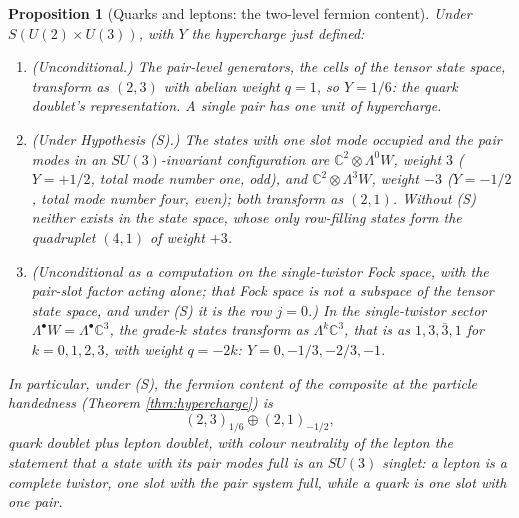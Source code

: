 \documentclass[11pt]{article}
\newtheorem{proposition}[theorem]{Proposition}
\theoremstyle{definition}
\newcommand{\C}{\mathbb{C}}
\begin{document}
\begin{proposition}[Quarks and leptons: the two-level fermion content]\label{prop:content}
Under $S(U(2) \times U(3))$, with $Y$ the hypercharge just defined:
\begin{enumerate}
\item (Unconditional.) The pair-level generators, the cells of the tensor state space, transform as $(2, 3)$ with abelian weight $q = 1$, so $Y = 1/6$: the quark doublet's representation. A single pair has one unit of hypercharge.
\item (Under Hypothesis (S).) The states with one slot mode occupied and the pair modes in an $SU(3)$-invariant configuration are $\C^{2} \otimes \Lambda^{0}W$, weight $3$ ($Y = +1/2$, total mode number one, odd), and $\C^{2} \otimes \Lambda^{3}W$, weight $-3$ ($Y = -1/2$, total mode number four, even); both transform as $(2, 1)$. Without (S) neither exists in the state space, whose only row-filling states form the quadruplet $(4,1)$ of weight $+3$.
\item (Unconditional as a computation on the single-twistor Fock space, with the pair-slot factor acting alone; that Fock space is not a subspace of the tensor state space, and under (S) it is the row $j = 0$.) In the single-twistor sector $\Lambda^{\bullet}W = \Lambda^{\bullet}\C^{3}$, the grade-$k$ states transform as $\Lambda^{k}\C^{3}$, that is as $1, 3, \bar{3}, 1$ for $k = 0, 1, 2, 3$, with weight $q = -2k$: $Y = 0, -1/3, -2/3, -1$.
\end{enumerate}
In particular, under (S), the fermion content of the composite at the particle handedness (Theorem \ref{thm:hypercharge}) is
\begin{equation}\label{eq:content}
(2,3)_{1/6} \oplus (2,1)_{-1/2},
\end{equation}
quark doublet plus lepton doublet, with colour neutrality of the lepton the statement that a state with its pair modes full is an $SU(3)$ singlet: a lepton is a complete twistor, one slot with the pair system full, while a quark is one slot with one pair.
\end{proposition}
\end{document}
